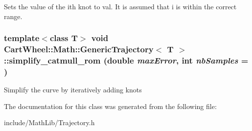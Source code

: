 \label{classCartWheel_1_1Math_1_1GenericTrajectory_a9e467a94f7ddb3caada5614dfb801206}
Sets the value of the ith knot to val. It is assumed that i is within the correct range. \hypertarget{classCartWheel_1_1Math_1_1GenericTrajectory_a8500a009dc797436b7ccf0a5f5b6d69a}{
\subsubsection[{simplify\_\-catmull\_\-rom}]{\setlength{\rightskip}{0pt plus 5cm}template$<$class T$>$ void {\bf CartWheel::Math::GenericTrajectory}$<$ T $>$::simplify\_\-catmull\_\-rom (double {\em maxError}, \/  int {\em nbSamples} = {})}}
\label{classCartWheel_1_1Math_1_1GenericTrajectory_a8500a009dc797436b7ccf0a5f5b6d69a}
Simplify the curve by iteratively adding knots 

The documentation for this class was generated from the following file:\begin{DoxyCompactItemize}
\item 
include/MathLib/Trajectory.h\end{DoxyCompactItemize}
